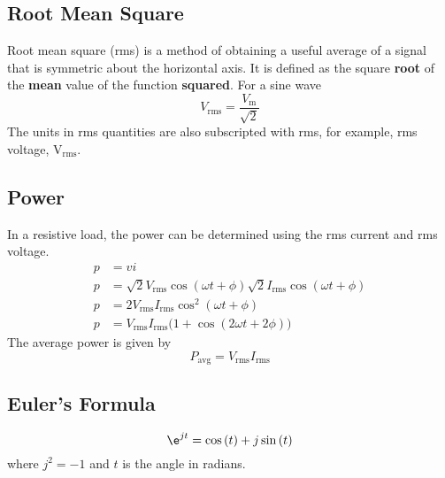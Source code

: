 \documentclass{article}
\begin{document}
\subsection{Root Mean Square}
\begin{definition}
    Root mean square (rms) is a method of obtaining a useful average of a signal that is symmetric about
    the horizontal axis. It is defined as the square \textbf{root} of the \textbf{mean} value of the
    function \textbf{squared}.
    For a sine wave
    \begin{equation*}
        V_{\mathrm{rms}} = \frac{V_{\mathrm{m}}}{\sqrt{2}}
    \end{equation*}
    The units in rms quantities are also subscripted with rms, for example, rms voltage, $\si{\volt}_{\mathrm{rms}}$.
\end{definition}
\subsection{Power}
\begin{definition}
    In a resistive load, the power can be determined using the rms current and rms voltage.
    \begin{align*}
        p & = vi                                                                                                                       \\
        p & = \sqrt{2}V_{\mathrm{rms}}\cos{\left( \omega t + \phi \right)}\sqrt{2}I_{\mathrm{rms}}\cos{\left( \omega t + \phi \right)} \\
        p & = 2V_{\mathrm{rms}}I_{\mathrm{rms}}\cos^2{\left( \omega t + \phi \right)}                                                  \\
        p & = V_{\mathrm{rms}}I_{\mathrm{rms}}\bigl( 1 + \cos{\left( 2 \omega t + 2 \phi \right)} \bigr)
    \end{align*}
    The average power is given by
    \begin{equation*}
        P_{\mathrm{avg}} = V_{\mathrm{rms}}I_{\mathrm{rms}}
    \end{equation*}
\end{definition}
\subsection{Euler's Formula}
\begin{theorem}\label{theorem:eulers_formula}
    \begin{equation*}
        \e^{jt} = \cos{\left( t \right)} + j \sin{\left( t \right)}
    \end{equation*}
    where $j^2=-1$ and $t$ is the angle in radians.
\end{theorem}
\end{document}
